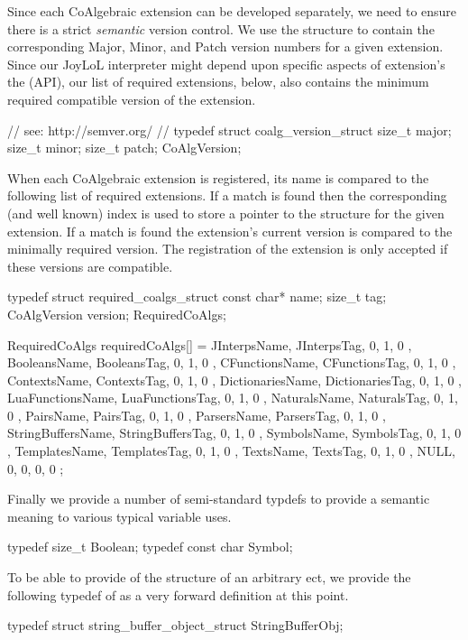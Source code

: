 Since each CoAlgebraic extension can be developed separately, we need to 
ensure there is a strict \emph{semantic} version control. We use the 
 structure to contain the corresponding Major, Minor, 
and Patch version numbers for a given extension. Since our JoyLoL 
interpreter might depend upon specific aspects of extension's the 
 (API), our list of required 
extensions, below, also contains the minimum required compatible version 
of the extension. 

\startCHeader
// see: http://semver.org/
//
typedef struct coalg_version_struct {
  size_t major;
  size_t minor;
  size_t patch;
} CoAlgVersion;
\stopCHeader

When each CoAlgebraic extension is registered, its name is compared to the 
following list of required extensions. If a match is found then the 
corresponding (and well known) index is used to store a pointer to the 
 structure for the given extension. If a match is found 
the extension's current version is compared to the minimally required 
version. The registration of the extension is only accepted if these 
versions are compatible. 

\startCCode
typedef struct required_coalgs_struct {
  const char*  name;
  size_t       tag;
  CoAlgVersion version;
} RequiredCoAlgs;

RequiredCoAlgs requiredCoAlgs[] = {
  { JInterpsName,      JInterpsTag,      {0, 1, 0 }},
  { BooleansName,      BooleansTag,      {0, 1, 0 }},
  { CFunctionsName,    CFunctionsTag,    {0, 1, 0 }},
  { ContextsName,      ContextsTag,      {0, 1, 0 }},
  { DictionariesName,  DictionariesTag,  {0, 1, 0 }},
  { LuaFunctionsName,  LuaFunctionsTag,  {0, 1, 0 }},
  { NaturalsName,      NaturalsTag,      {0, 1, 0 }},
  { PairsName,         PairsTag,         {0, 1, 0 }},
  { ParsersName,       ParsersTag,       {0, 1, 0 }},
  { StringBuffersName, StringBuffersTag, {0, 1, 0 }},
  { SymbolsName,       SymbolsTag,       {0, 1, 0 }},
  { TemplatesName,     TemplatesTag,     {0, 1, 0 }},
  { TextsName,         TextsTag,         {0, 1, 0 }},
  { NULL,              0,                {0, 0, 0 }}
};
\stopCCode

Finally we provide a number of semi-standard typdefs to provide a semantic 
meaning to various typical variable uses. 

\startCHeader
typedef size_t     Boolean;
typedef const char Symbol;
\stopCHeader

To be able to provide  of the structure of an arbitrary 
ect, we provide the following typedef of 
 as a very forward definition at this point. 

\startCHeader
typedef struct string_buffer_object_struct StringBufferObj;
\stopCHeader